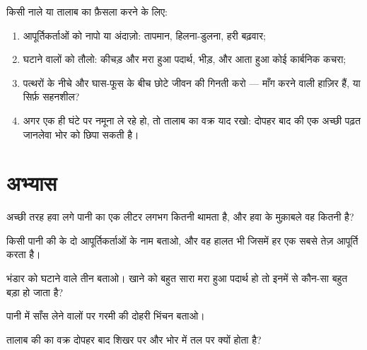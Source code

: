 \begin{method}[किसी पानी का फ़ैसला करना]\label{met:g7:oxygen-in-the-water:judge}
किसी नाले या तालाब का फ़ैसला करने के लिए:
\begin{enumerate}
  \item आपूर्तिकर्ताओं को नापो या अंदाज़ो: तापमान, हिलना-डुलना, हरी
        बढ़वार;
  \item घटाने वालों को तौलो: कीचड़ और मरा हुआ पदार्थ, भीड़, और आता हुआ
        कोई कार्बनिक कचरा;
  \item पत्थरों के नीचे और घास-फूस के बीच छोटे जीवन की गिनती करो ---
        माँग करने वाली  हाज़िर हैं, या सिर्फ़ सहनशील?
  \item अगर एक ही घंटे पर नमूना ले रहे हो, तो तालाब का वक्र याद रखो:
        दोपहर बाद की एक अच्छी पढ़त जानलेवा भोर को छिपा सकती है।
\end{enumerate}
\end{method}

\section{अभ्यास}

\begin{exercise}[$\star$]\label{exo:g7:oxygen-in-the-water:1}
अच्छी तरह हवा लगे पानी का एक लीटर लगभग कितनी  थामता है, और हवा
के मुक़ाबले वह कितनी है?
\end{exercise}

\begin{exercise}[$\star$]\label{exo:g7:oxygen-in-the-water:2}
किसी पानी की  के दो आपूर्तिकर्ताओं के नाम बताओ, और वह हालत भी
जिसमें हर एक सबसे तेज़ आपूर्ति करता है।
\end{exercise}

\begin{exercise}[$\star$]\label{exo:g7:oxygen-in-the-water:3}
भंडार को घटाने वाले तीन बताओ। खाने को बहुत सारा मरा हुआ पदार्थ हो तो
इनमें से कौन-सा बहुत बड़ा हो जाता है?
\end{exercise}

\begin{exercise}[$\star$]\label{exo:g7:oxygen-in-the-water:4}
पानी में साँस लेने वालों पर गरमी की दोहरी भिंचन बताओ।
\end{exercise}

\begin{exercise}[$\star$]\label{exo:g7:oxygen-in-the-water:5}
तालाब की  का वक्र दोपहर बाद शिखर पर और भोर में तल पर क्यों होता
है?
\end{exercise}


